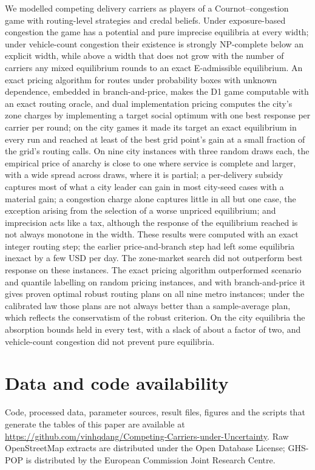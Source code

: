 \documentclass[preprint,12pt]{elsarticle}
\theoremstyle{definition}
\theoremstyle{remark}
\begin{document}
We modelled competing delivery carriers as players of a Cournot--congestion game with routing-level strategies and credal beliefs. Under exposure-based congestion the game has a potential and pure imprecise equilibria at every width; under vehicle-count congestion their existence is strongly NP-complete below an explicit width, while above a width that does not grow with the number of carriers any mixed equilibrium rounds to an exact E-admissible equilibrium. An exact pricing algorithm for routes under probability boxes with unknown dependence, embedded in branch-and-price, makes the D1 game computable with an exact routing oracle, and dual implementation pricing computes the city's zone charges by implementing a target social optimum with one best response per carrier per round; on the city games it made its target an exact equilibrium in every run and reached at least \DipGainMinAll{} of the best grid point's gain at a small fraction of the grid's routing calls. On nine city instances with three random draws each, the empirical price of anarchy is close to one where service is complete and larger, with a wide spread across draws, where it is partial; a per-delivery subsidy captures most of what a city leader can gain in most city-seed cases with a material gain; a congestion charge alone captures little in all but one case, the exception arising from the selection of a worse unpriced equilibrium; and imprecision acts like a tax, although the response of the equilibrium reached is not always monotone in the width. These results were computed with an exact integer routing step; the earlier price-and-branch step had left some equilibria inexact by a few USD per day. The zone-market search did not outperform best response on these instances. The exact pricing algorithm outperformed scenario and quantile labelling on random pricing instances, and with branch-and-price it gives proven optimal robust routing plans on all nine metro instances; under the calibrated law those plans are not always better than a sample-average plan, which reflects the conservatism of the robust criterion. On the city equilibria the absorption bounds held in every test, with a slack of about a factor of two, and vehicle-count congestion did not prevent pure equilibria.

\section*{Data and code availability}
Code, processed data, parameter sources, result files, figures and the scripts that generate the tables of this paper are available at \url{https://github.com/vinhqdang/Competing-Carriers-under-Uncertainty}. Raw OpenStreetMap extracts are distributed under the Open Database License; GHS-POP is distributed by the European Commission Joint Research Centre.
\end{document}
